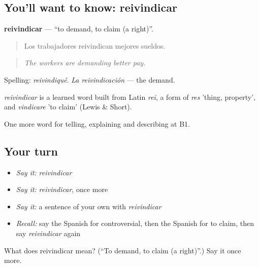 \subsection*{You'll want to know: reivindicar}
\textbf{reivindicar} — \textquotedblleft{}to demand, to claim (a right)\textquotedblright{}.

\begin{quote}
Los trabajadores reivindican mejores sueldos.
\end{quote}

\begin{quote}
\emph{The workers are demanding better pay.}
\end{quote}

Spelling: \emph{reivindiqué}. \emph{La reivindicación} — the demand.

\begin{cousinweb}
\emph{reivindicar} is a learned word built from Latin \emph{rei}, a form of \emph{res} 'thing, property', and \emph{vindicare} 'to claim' (Lewis \& Short).
\end{cousinweb}

\begin{grammarlens}[title={What you've built}]
One more word for telling, explaining and describing at B1.
\end{grammarlens}

\subsection*{Your turn}
\begin{itemize}
\raggedright
  \item \emph{Say it:} \emph{reivindicar}
  \item \emph{Say it:} \emph{reivindicar}, once more
  \item \emph{Say it:} a sentence of your own with \emph{reivindicar}
  \item \emph{Recall:} say the Spanish for controversial, then the Spanish for to claim, then say \emph{reivindicar} again
\end{itemize}

\begin{tcolorbox}[breakable,colback=teal!4,colframe=teal!35!black,title={Before you move on}]
What does reivindicar mean? (\textquotedblleft{}To demand, to claim (a right)\textquotedblright{}.) Say it once more.
\end{tcolorbox}
